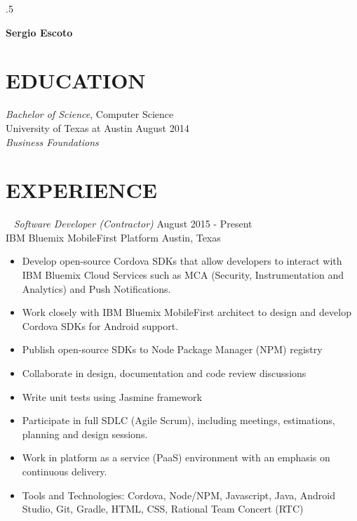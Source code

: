 \documentclass[line,margin]{res}
\begin{document}
\moveleft.5\hoffset\centerline{\large\bf Sergio Escoto}
\address{ github.com/ses110 $\mid$ ses110@utexas.edu $\mid$ (305)-213-4130 }
 
\begin{resume}

\section{EDUCATION} {\sl Bachelor of Science}, Computer Science \\
                University of Texas at Austin \hfill August 2014 \\
                {\sl \small Business Foundations }

\section{EXPERIENCE} 
    {\sl Software Developer (Contractor)} \hfill August 2015 - Present \\
    { IBM Bluemix MobileFirst Platform } \hfill Austin, Texas \\
    \begin{itemize} \itemsep -2pt
    \item \small Develop open-source Cordova SDKs that allow developers to interact with IBM Bluemix Cloud Services such as MCA (Security, Instrumentation and Analytics) and Push Notifications.
    \item \small Work closely with IBM Bluemix MobileFirst architect to design and develop Cordova SDKs for Android support.
    \item \small Publish open-source SDKs to Node Package Manager (NPM) registry
    \item \small Collaborate in design, documentation and code review discussions
    \item \small Write unit tests using Jasmine framework
    \item \small Participate in full SDLC (Agile Scrum), including meetings, estimations, planning and design sessions.
    \item \small Work in platform as a service (PaaS) environment with an emphasis on continuous delivery.
    \item \small Tools and Technologies: Cordova, Node/NPM, Javascript, Java, Android Studio, Git, Gradle, HTML, CSS, Rational Team Concert (RTC)


\end{itemize}
\end{resume}
\end{document}
